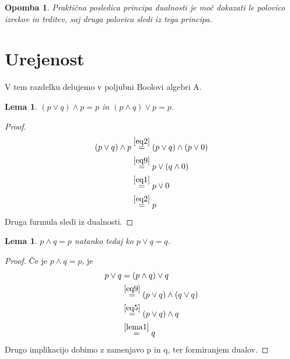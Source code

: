 \documentclass{amsart}
\newtheorem{lema}[izrek]{Lema}
\newtheorem{opomba}[izrek]{Opomba}
\begin{document}
\begin{opomba}
    Praktična posledica principa dualnosti je moč dokazati le polovico izrekov in trditev, 
    saj druga polovica sledi iz tega principa.
\end{opomba}

\section{Urejenost}

V tem razdelku delujemo v poljubni Boolovi algebri A.

\begin{lema}
    \label{lema1}
    \(\left(p \vee q\right) \wedge p = p\) in \(\left(p \wedge q\right) \vee p = p\).
\end{lema}

\begin{proof} 
    \begin{align*}
        \left(p \vee q\right) \wedge p &\stackrel{\eqref{eq2}}{=} \left(p \vee q\right) \wedge \left(p \vee 0 \right) \\
                    &\stackrel{\eqref{eq9}}{=} p \vee \left(q \wedge 0\right)\\
                    &\stackrel{\eqref{eq1}}{=} p \vee 0\\
                    &\stackrel{\eqref{eq2}}{=} p 
    \end{align*}
    Druga furmula sledi iz dualnosti.

\end{proof}


\begin{lema}
    \label{lema2}
    \(p \wedge q = p\) natanko tedaj ko \(p \vee q = q\).
\end{lema}

\begin{proof}
    Če je \(p \wedge q = p\), je 
    \begin{align*}
        p \vee q &\stackrel{}{=} \left(p \wedge q\right) \vee q \\
                    &\stackrel{\eqref{eq9}}{=} \left(p \vee q\right) \wedge \left(q \vee q\right) \\
                    &\stackrel{\eqref{eq5}}{=} \left(p \vee q\right) \wedge q\\
                    &\stackrel{\ref{lema1}}{=} q 
    \end{align*}
    Drugo implikacijo dobimo z zamenjavo p in q, ter formiranjem dualov.
\end{proof}
\end{document}
